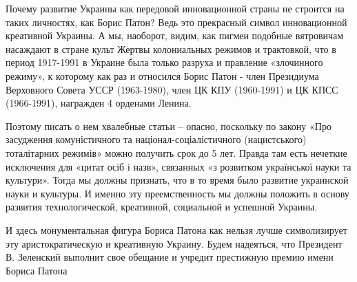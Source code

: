 
Почему развитие Украины как передовой инновационной страны не строится на таких
личностях, как Борис Патон? Ведь это прекрасный символ инновационной креативной
Украины. А мы, наоборот, видим, как пигмеи подобные вятровичам насаждают в
стране культ Жертвы колониальных режимов и трактовкой, что в период 1917-1991 в
Украине была только разруха и правление «злочинного режиму», к которому как раз
и относился Борис Патон - член Президиума Верховного Совета УССР (1963-1980),
член ЦК КПУ (1960-1991) и ЦК КПСС (1966-1991), награжден 4 орденами Ленина.


Поэтому писать о нем хвалебные статьи – опасно, поскольку по закону «Про
засудження комуністичного та націонал-соціалістичного (нацистського)
тоталітарних режимів» можно получить срок до 5 лет. Правда там есть нечеткие
исключения для «цитат осіб і назв», связанных «з розвитком української науки та
культури». Тогда мы должны признать, что в то время было развитие украинской
науки и культуры. И именно эту преемственность мы должны положить в основу
развития технологической, креативной, социальной и успешной Украины.

И здесь монументальная фигура Бориса Патона как нельзя лучше символизирует эту
аристократическую и креативную Украину. Будем надеяться, что Президент В.
Зеленский выполнит свое обещание и учредит престижную премию имени Бориса
Патона
